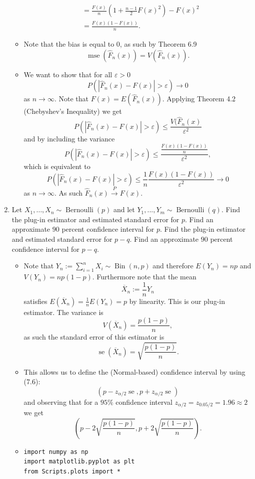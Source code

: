 \documentclass{article}
\newcommand{\mse}{\operatorname{mse}}
\newcommand{\se}{\operatorname{se}}
\newcommand{\Bernoulli}{\operatorname{Bernoulli}}
\newcommand{\Bin}{\operatorname{Bin}}
\begin{document}
\begin{enumerate}
\begin{itemize}
$$\begin{aligned}
			&= \frac{F(x)}{n}\left(1 + \frac{n - 1}{2} F(x)^2 \right) - F(x)^2 \\
			&= \frac{F(x)(1 - F(x))}{n}.
			\end{aligned}
			$$
			\item Note that the bias is equal to $0$, as such by Theorem 6.9
			$$
			\mse(\hat{F}_n(x)) = V(\hat{F}_n(x)).
			$$
			\item We want to show that for all $\varepsilon > 0$
			$$
			P(|\hat{F}_n(x) - F(x)| > \varepsilon) \rightarrow 0
			$$
			as $n \rightarrow \infty$. Note that $F(x) = E(\hat{F}_n(x))$. Applying Theorem 4.2 (Chebyshev's Inequality) we get
			$$
			P(|\hat{F}_n(x) - F(x)| > \varepsilon) \leq \frac{V(\hat{F}_n(x)}{\varepsilon^2}
			$$
			and by including the variance
			$$
			P(|\hat{F}_n(x) - F(x)| > \varepsilon) \leq \frac{\frac{F(x)(1 - F(x))}{n}}{\varepsilon^2},
			$$
			which is equivalent to
			$$
			P(|\hat{F}_n(x) - F(x)| > \varepsilon) \leq \frac{1}{n} \frac{F(x)(1 - F(x))}{\varepsilon^2} \rightarrow 0
			$$
			as $n \rightarrow \infty$. As such $\hat{F}_n(x) \overset{P}{\rightarrow} F(x)$.
		\end{itemize}
	\item Let $X_1, \dots, X_n \sim \Bernoulli(p)$ and let $Y_1 , ... , Y_m \sim \Bernoulli(q)$. Find the plug-in estimator and estimated standard error for $p$. Find an approximate $90$ percent confidence interval for $p$. Find the plug-in estimator and estimated standard error for $p - q$. Find an approximate $90$ percent confidence interval for $p - q$.
		\begin{itemize}
			\item Note that $Y_n := \sum_{i = 1}^n X_i \sim \Bin(n, p)$ and therefore $E(Y_n) = np$ and $V(Y_n) = np(1 - p)$. Furthermore note that the mean
			$$
			\overline{X}_n := \frac{1}{n} Y_n
			$$
			satisfies $E(\overline{X}_n) = \frac{1}{n}E(Y_n) = p$ by linearity. This is our plug-in estimator. The variance is
			$$
			V(\overline{X}_n) = \frac{p(1 - p)}{n},
			$$
			as such the standard error of this estimator is
			$$
			\se(\overline{X}_n) = \sqrt{\frac{p(1 - p)}{n}}.
			$$
			\item This allows us to define the (Normal-based) confidence interval by using (7.6):
			$$
			(p - z_{\alpha / 2} \se, p + z_{\alpha / 2} \se)
			$$
			and observing that for a $95\%$ confidence interval $z_{\alpha / 2} = z_{0.05/2} = 1.96 \approx 2$ we get
			$$
			\left(p - 2\sqrt{\frac{p(1 - p)}{n}}, p + 2\sqrt{\frac{p(1 - p)}{n}}\right).
			$$
			\item
\begin{verbatim}
import numpy as np
import matplotlib.pyplot as plt
from Scripts.plots import *


\end{verbatim}
\end{itemize}
\end{enumerate}
\end{document}
